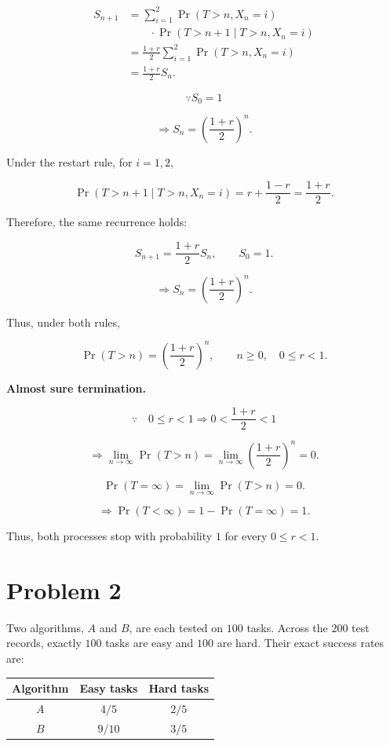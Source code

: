 \documentclass[11pt,a4paper]{article}
\begin{document}
\begin{enumerate}
\[
\begin{aligned}
S_{n+1}
&=\sum_{i=1}^{2}
\Pr(T>n,X_n=i)\\
&\qquad\cdot
\Pr(T>n+1\mid T>n,X_n=i)\\[4pt]
&=\frac{1+r}{2}
\sum_{i=1}^{2}\Pr(T>n,X_n=i)\\[4pt]
&=\frac{1+r}{2}S_n.
\end{aligned}
\]

\[
\because S_0=1
\]

\[
\Rightarrow
S_n=\left(\frac{1+r}{2}\right)^n.
\]

Under the restart rule, for $i=1,2$,

\[
\Pr(T>n+1\mid T>n,X_n=i)
=r+\frac{1-r}{2}
=\frac{1+r}{2}.
\]

Therefore, the same recurrence holds:

\[
S_{n+1}=\frac{1+r}{2}S_n,
\qquad S_0=1.
\]

\[
\Rightarrow
S_n=\left(\frac{1+r}{2}\right)^n.
\]

Thus, under both rules,

\[
\Pr(T>n)
=\left(\frac{1+r}{2}\right)^n,
\qquad n\ge0,\quad 0\le r<1.
\]

\medskip
\noindent
\textbf{Almost sure termination.}

\[
\because\quad
0\le r<1
\Rightarrow
0<\frac{1+r}{2}<1
\]

\[
\Rightarrow
\lim_{n\to\infty}\Pr(T>n)
=
\lim_{n\to\infty}
\left(\frac{1+r}{2}\right)^n
=0.
\]

\[
\Pr(T=\infty)
=\lim_{n\to\infty}\Pr(T>n)=0.
\]

\[
\Rightarrow
\Pr(T<\infty)
=1-\Pr(T=\infty)
=1.
\]

Thus, both processes stop with probability $1$
for every $0\le r<1$.

\end{enumerate}


\clearpage
\section*{Problem 2}

Two algorithms, $A$ and $B$, are each tested on $100$ tasks.
Across the $200$ test records, exactly $100$ tasks are easy
and $100$ are hard. Their exact success rates are:

\begin{center}
\begin{tabular}{ccc}
\toprule
Algorithm & Easy tasks & Hard tasks\\
\midrule
$A$ & $4/5$ & $2/5$\\
$B$ & $9/10$ & $3/5$\\
\bottomrule
\end{tabular}
\end{center}
\end{document}
